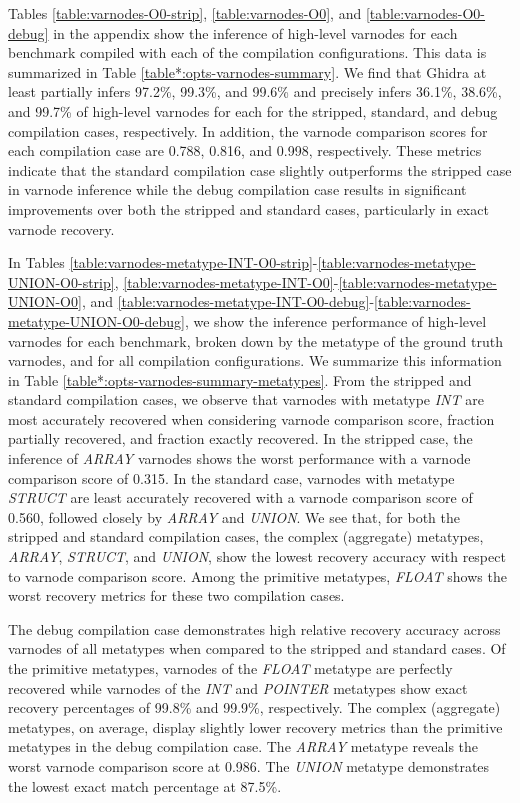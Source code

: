 \documentclass[conference]{IEEEtran}
\begin{document}


Tables \ref{table:varnodes-O0-strip}, \ref{table:varnodes-O0}, and \ref{table:varnodes-O0-debug} in the appendix show the inference of high-level varnodes for each benchmark compiled with each of the compilation configurations. This data is summarized in Table \ref{table*:opts-varnodes-summary}. We find that Ghidra at least partially infers 97.2\%, 99.3\%, and 99.6\% and precisely infers 36.1\%, 38.6\%, and 99.7\% of high-level varnodes for each for the stripped, standard, and debug compilation cases, respectively. In addition, the varnode comparison scores for each compilation case are 0.788, 0.816, and 0.998, respectively. These metrics indicate that the standard compilation case slightly outperforms the stripped case in varnode inference while the debug compilation case results in significant improvements over both the stripped and standard cases, particularly in exact varnode recovery.



In Tables \ref{table:varnodes-metatype-INT-O0-strip}-\ref{table:varnodes-metatype-UNION-O0-strip}, \ref{table:varnodes-metatype-INT-O0}-\ref{table:varnodes-metatype-UNION-O0}, and \ref{table:varnodes-metatype-INT-O0-debug}-\ref{table:varnodes-metatype-UNION-O0-debug}, we show the inference performance of high-level varnodes for each benchmark, broken down by the metatype of the ground truth varnodes, and for all compilation configurations. We summarize this information in Table \ref{table*:opts-varnodes-summary-metatypes}. From the stripped and standard compilation cases, we observe that varnodes with metatype \emph{INT} are most accurately recovered when considering varnode comparison score, fraction partially recovered, and fraction exactly recovered. In the stripped case, the inference of \emph{ARRAY} varnodes shows the worst performance with a varnode comparison score of 0.315. In the standard case, varnodes with metatype \emph{STRUCT} are least accurately recovered with a varnode comparison score of 0.560, followed closely by \emph{ARRAY} and \emph{UNION}. We see that, for both the stripped and standard compilation cases, the complex (aggregate) metatypes, \emph{ARRAY}, \emph{STRUCT}, and \emph{UNION}, show the lowest recovery accuracy with respect to varnode comparison score. Among the primitive metatypes, \emph{FLOAT} shows the worst recovery metrics for these two compilation cases.

The debug compilation case demonstrates high relative recovery accuracy across varnodes of all metatypes when compared to the stripped and standard cases. Of the primitive metatypes, varnodes of the \emph{FLOAT} metatype are perfectly recovered while varnodes of the \emph{INT} and \emph{POINTER} metatypes show exact recovery percentages of 99.8\% and 99.9\%, respectively. The complex (aggregate) metatypes, on average, display slightly lower recovery metrics than the primitive metatypes in the debug compilation case. The \emph{ARRAY} metatype reveals the worst varnode comparison score at 0.986. The \emph{UNION} metatype demonstrates the lowest exact match percentage at 87.5\%.
\end{document}
